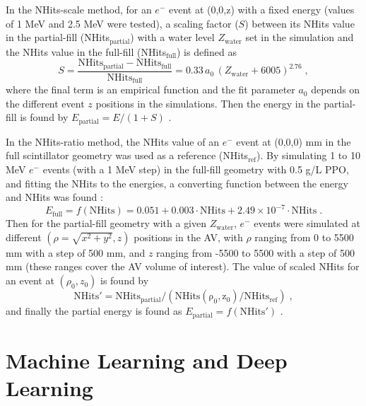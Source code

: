 In the NHits-scale method, for an $e^-$ event at (0,0,z) with a fixed energy (values of 1 MeV and 2.5 MeV were tested), a scaling factor ($S$) between its NHits value in the partial-fill (NHits$_\mathrm{partial}$) with a water level $Z_\mathrm{water}$ set in the simulation and the NHits value in the full-fill (NHits$_\mathrm{full}$) is defined as
\begin{equation}
S = \mathrm{\frac{NHits_{partial} - NHits_{full}}{NHits_{full}}} = 0.33 \, a_0 \, \left( Z_\mathrm{water} + 6005 \right)^{2.76} \; ,
\end{equation}
where the final term is an empirical function and the fit parameter $a_0$ depends on the different event $z$ positions in the simulations. Then the energy in the partial-fill is found by $E_\mathrm{partial} = E/(1 + S)$ \cite{partialEnergy, jiePartialEnergy}.
 
In the NHits-ratio method, the NHits value of an $e^-$ event at (0,0,0) mm in the full scintillator geometry was used as a reference (NHits$_\mathrm{ref}$). By simulating 1 to 10 MeV $e^-$ events (with a 1 MeV step) in the full-fill geometry with 0.5 g/L PPO, and fitting the NHits to the energies, a converting function between the energy and NHits was found \cite{jiePartialEnergyNhitRatio}: 
\begin{equation}
E_\mathrm{full} = f(\mathrm{NHits})=0.051+0.003\cdot \mathrm{NHits}+2.49\times 10^{-7}\cdot \mathrm{NHits} \; .    
\end{equation}
Then for the partial-fill geometry with a given $Z_\mathrm{water}$, $e^-$ events were simulated at different $(\rho=\sqrt{x^2+y^2},z)$ positions in the AV, with $\rho$ ranging from 0 to 5500 mm with a step of 500 mm, and $z$ ranging from -5500 to 5500 with a step of 500 mm (these ranges cover the AV volume of interest). The value of scaled NHits for an event at $(\rho_0,z_0)$ is found by
\begin{equation}
\mathrm{NHits' = NHits_{partial}/(NHits(\rho_0,z_0)/NHits_{ref})} \; ,
\end{equation}
and finally the partial energy is found as $E_\mathrm{partial} = f(\mathrm{NHits'})$ \cite{jiePartialEnergyNhitRatio}.

\section{Machine Learning and Deep Learning}

